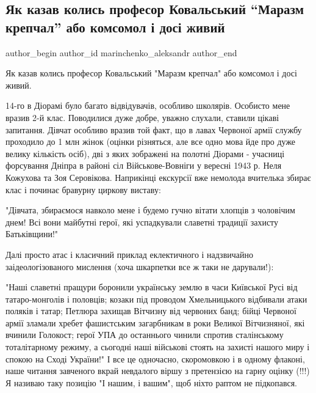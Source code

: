  
 
 
 
 
 
\subsection{Як казав колись професор Ковальський \enquote{Маразм крепчал} або комсомол і досі живий}
\label{sec:17_10_2021.fb.marinchenko_aleksandr.1.diorama_deti_ideologia_komsomol}
 
\ifcmt
 author_begin
   author_id marinchenko_aleksandr
 author_end
\fi


Як казав колись професор Ковальський "Маразм крепчал" або комсомол і досі
живий.

14-го в Діорамі було багато відвідувачів, особливо школярів. Особисто мене
вразив 2-й клас. Поводилися дуже добре, уважно слухали, ставили цікаві
запитання. Дівчат особливо вразив той факт, що в лавах Червоної армії службу
проходило до 1 млн жінок (оцінки різняться, але все одно мова йде про дуже
велику кількість осіб), дві з яких зображені на полотні Діорами - учасниці
форсування Дніпра в районі сіл Військове-Вовніги у вересні 1943 р. Неля
Кожухова та Зоя Серовікова. Наприкінці екскурсії вже немолода вчителька збирає
клас і починає бравурну циркову виставу:

"Дівчата, збираємося навколо мене і будемо гучно вітати хлопців з чоловічим
днем! Всі вони майбутні герої, які успадкували славетні традиції захисту
Батьківщини!" 

Далі просто атас і класичний приклад еклектичного і надзвичайно
заідеологізованого мислення (хоча шкарпетки все ж таки не дарували!):

"Наші славетні пращури боронили українську землю в часи Київської Русі від
татаро-монголів і половців; козаки під проводом Хмельницького відбивали атаки
поляків і татар; Петлюра захищав Вітчизну від червоних банд; бійці Червоної
армії зламали хребет фашистським загарбникам в роки Великої Вітчизняної, які
вчинили Голокост; герої УПА до останнього чинили спротив сталінському
тоталітарному режиму, а сьогодні наші військові стоять на захисті нашого миру і
спокою на Сході України!" І все це одночасно, скоромовкою і в одному флаконі,
наше читання завченого вкрай невдалого віршу з претензією на гарну оцінку (!!!)
Я називаю таку позицію "І нашим, і вашим", щоб ніхто раптом не підкопався. 

